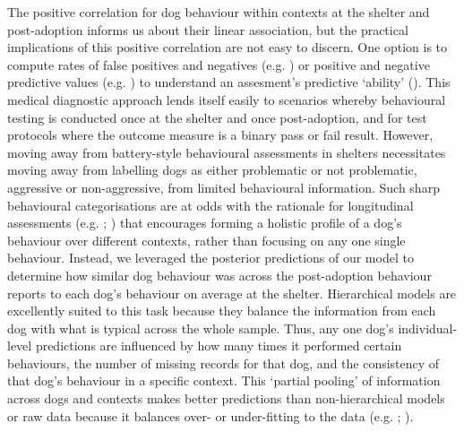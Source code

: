 \documentclass[12pt]{article}
\begin{document}
The positive correlation for dog behaviour within contexts at the shelter and post-adoption informs us about their linear association, but the practical implications of this positive correlation are not easy to discern. One option is to compute rates of false positives and negatives (e.g. \cite{marder2013}) or positive and negative predictive values (e.g. \cite{patbrad2016}) to understand an assesment's predictive `ability' (\cite{patronek2019}). This medical diagnostic approach lends itself easily to scenarios whereby behavioural testing is conducted once at the shelter and once post-adoption, and for test protocols where the outcome measure is a binary pass or fail result. However, moving away from battery-style behavioural assessments in shelters necessitates moving away from labelling dogs as either problematic or not problematic, aggressive or non-aggressive, from limited behavioural information. Such sharp behavioural categorisations are at odds with the rationale for longitudinal assessments (e.g. \cite{ASPCA2018}; \cite{rayment2015}) that encourages forming a holistic profile of a dog's behaviour over different contexts, rather than focusing on any one single behaviour. Instead, we leveraged the posterior predictions of our model to determine how similar dog behaviour was across the post-adoption behaviour reports to each dog's behaviour on average at the shelter. Hierarchical models are excellently suited to this task because they balance the information from each dog with what is typical across the whole sample. Thus, any one dog's individual-level predictions are influenced by how many times it performed certain behaviours, the number of missing records for that dog, and the consistency of that dog's behaviour in a specific context. This `partial pooling' of information across dogs and contexts makes better predictions than non-hierarchical models or raw data because it balances over- or under-fitting to the data (e.g. \cite{gelman2007}; \cite{mcelreath2014}).
\end{document}
